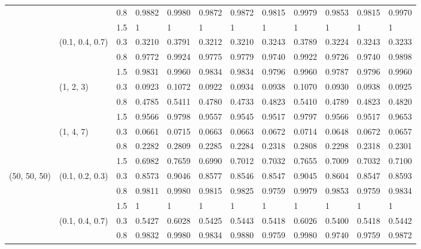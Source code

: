 \begin{table}[h]
\begin{tabular}{llllllllllll}
             		&                 	& 0.8 	& 0.9882 	& 0.9980  & 0.9872 	& 0.9872 	& 0.9815 	& 0.9979 	& 0.9853 	& 0.9815 	& 0.9970  \\
             		&                 	& 1.5 	& 1 		& 1  		& 1 		& 1 		& 1	 	& 1	 	& 1 		& 1 		& 1	        \\
             		& (0.1, 0.4, 0.7)	& 0.3 	& 0.3210 	& 0.3791 	& 0.3212 	& 0.3210  	& 0.3243 	& 0.3789 	& 0.3224 	& 0.3243 	& 0.3233 \\
             		&                 	& 0.8 	& 0.9772 	& 0.9924	& 0.9775 	& 0.9779 	& 0.9740  	& 0.9922 	& 0.9726 	& 0.9740  	& 0.9898 \\
             		&                 	& 1.5 	& 0.9831 	& 0.9960  & 0.9834 	& 0.9834 	& 0.9796 	& 0.9960 	& 0.9787 	& 0.9796 	& 0.9960  \\
             		& (1, 2, 3)       	& 0.3 	& 0.0923 	& 0.1072 	& 0.0922 	& 0.0934 	& 0.0938 	& 0.1070 	& 0.0930 	& 0.0938 	& 0.0925 \\
             		&                 	& 0.8 	& 0.4785 	& 0.5411 	& 0.4780  	& 0.4733 	& 0.4823 	& 0.5410 	& 0.4789 	& 0.4823 	& 0.4820  \\
             		&                 	& 1.5 	& 0.9566 	& 0.9798 	& 0.9557 	& 0.9545 	& 0.9517 	& 0.9797 	& 0.9566 	& 0.9517 	& 0.9653 \\
             		& (1, 4, 7)       	& 0.3 	& 0.0661 	& 0.0715 	& 0.0663 	& 0.0663 	& 0.0672 	& 0.0714 	& 0.0648 	& 0.0672 	& 0.0657 \\
             		&                 	& 0.8 	& 0.2282 	& 0.2809 	& 0.2285 	& 0.2284 	& 0.2318 	& 0.2808 	& 0.2298 	& 0.2318 	& 0.2301 \\
             		&                 	& 1.5 	& 0.6982 	& 0.7659 	& 0.6990 	& 0.7012 	& 0.7032 	& 0.7655 	& 0.7009 	& 0.7032 	& 0.7100   \\\hline
(50, 50, 50) 	& (0.1, 0.2, 0.3)	& 0.3 	& 0.8573 	& 0.9046 	& 0.8577 	& 0.8546 	& 0.8547 	& 0.9045 	& 0.8604 	& 0.8547 	& 0.8593 \\
            		&                 	& 0.8 	& 0.9811 	& 0.9980  & 0.9815 	& 0.9825 	& 0.9759 	& 0.9979 	& 0.9853 	& 0.9759 	& 0.9834 \\
            		&                 	& 1.5 	& 1	 	& 1	 	& 1	 	& 1	 	& 1	 	& 1	 	& 1	 	& 1	 	& 1	        \\
            		& (0.1, 0.4, 0.7)	& 0.3 	& 0.5427 	& 0.6028 	& 0.5425 	& 0.5443 	& 0.5418 	& 0.6026 	& 0.5400 	& 0.5418 	& 0.5442 \\
             		&                 	& 0.8 	& 0.9832 	& 0.9980  & 0.9834 	& 0.9880 	& 0.9759 	& 0.9980 	& 0.9740  	& 0.9759 	& 0.9872 \\

\end{tabular}
\end{table}
